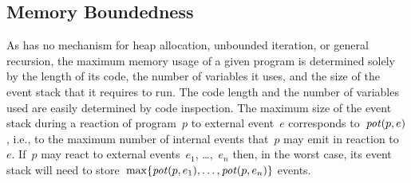 \subsection{Memory Boundedness}
\label{sec.proofs.bound}

As \CEU has no mechanism for heap allocation, unbounded iteration, or
general recursion, the maximum memory usage of a given \CEU program is
determined solely by the length of its code, the number of variables it
uses, and the size of the event stack that it requires to run.  The code
length and the number of variables used are easily determined by code
inspection.  The maximum size of the event stack during a reaction of
program~$p$ to external event~$e$ corresponds to~$\operatorname{\mathit{pot}}(p,e)$, i.e., to the
maximum number of internal events that~$p$ may emit in reaction to~$e$.
If~$p$ may react to external events~$e_1$, \dots,~$e_n$ then, in the worst
case, its event stack will need to
store~$\max\{\operatorname{\mathit{pot}}(p,e_1),\dots,\operatorname{\mathit{pot}}(p,e_n)\}$ events.


